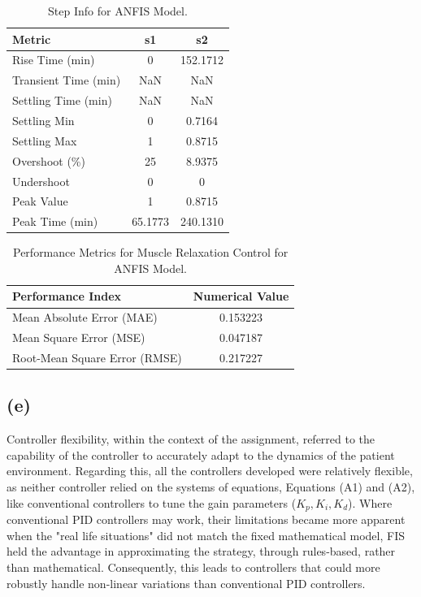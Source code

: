\documentclass[12pt]{article}
\begin{document}
\begin{table}[H]
\centering
\begin{tabular}{|l|c|c|}
\hline
\textbf{Metric} & \textbf{s1} & \textbf{s2} \\ \hline
Rise Time (min) & 0 & 152.1712 \\ \hline
Transient Time (min) & NaN & NaN \\ \hline
Settling Time (min) & NaN & NaN \\ \hline
Settling Min & 0 & 0.7164 \\ \hline
Settling Max & 1 & 0.8715 \\ \hline
Overshoot (\%) & 25 & 8.9375 \\ \hline
Undershoot & 0 & 0 \\ \hline
Peak Value & 1 & 0.8715 \\ \hline
Peak Time (min) & 65.1773 & 240.1310 \\ \hline
\end{tabular}
\caption{Step Info for ANFIS Model.}
\label{tab: characteristicsAd}
\end{table}

\begin{table}[H]
\centering
\begin{tabular}{|l|c|}
\hline
\textbf{Performance Index} & \textbf{Numerical Value} \\ \hline
Mean Absolute Error (MAE) & 0.153223 \\ \hline
Mean Square Error (MSE) & 0.047187 \\ \hline
Root-Mean Square Error (RMSE) &  0.217227 \\ \hline
\end{tabular}
\caption{Performance Metrics for Muscle Relaxation Control for ANFIS Model.}
\label{tab:performanceAd}
\end{table}

\subsection{(e)}
Controller flexibility, within the context of the assignment, referred to the capability of the controller to accurately adapt to the dynamics of the patient environment.
Regarding this, all the controllers developed were relatively flexible, as neither controller relied on the systems of equations, Equations (A1) and (A2), like conventional controllers to tune the gain parameters ($K_p, K_i, K_d$).
Where conventional PID controllers may work, their limitations became more apparent when the "real life situations" did not match the fixed mathematical model, FIS held the advantage in approximating the strategy, through rules-based, rather than mathematical.
Consequently, this leads to controllers that could more robustly handle non-linear variations than conventional PID controllers.
\\
\end{document}
